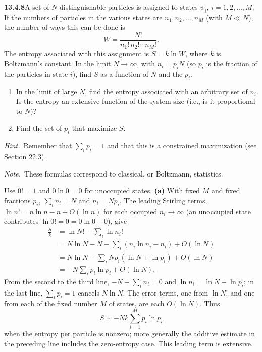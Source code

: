 \par\bigskip
\noindent\textbf{13.4.8}\quad A set of $N$ distinguishable particles is
assigned to states $\psi_{i}$, $i=1,2,\ldots,M$. If the numbers of particles
in the various states are $n_{1},n_{2},\ldots,n_{M}$ (with $M\ll N$), the
number of ways this can be done is
\[
W=\frac{N!}{n_{1}!\,n_{2}!\cdots n_{M}!}.
\]
The entropy associated with this assignment is $S=k\ln W$, where $k$ is
Boltzmann's constant. In the limit $N\to\infty$, with $n_{i}=p_{i}N$ (so
$p_{i}$ is the fraction of the particles in state $i$), find $S$ as a
function of $N$ and the $p_{i}$.
\begin{enumerate}
\item[(a)] In the limit of large $N$, find the entropy associated with an
  arbitrary set of $n_{i}$. Is the entropy an extensive function of the
  system size (i.e., is it proportional to $N$)?
\item[(b)] Find the set of $p_{i}$ that maximize $S$.
\end{enumerate}
\emph{Hint.}~Remember that $\sum_{i}p_{i}=1$ and that this is a constrained
maximization (see Section 22.3).

\emph{Note.}~These formulas correspond to classical, or Boltzmann,
statistics.
\par\smallskip
{}
\solution
Use $0!=1$ and $0\ln0=0$ for unoccupied states.
\textbf{(a)} With fixed $M$ and fixed fractions $p_i$,
$\sum_i n_i=N$ and $n_i=Np_i$.  The leading Stirling terms,
$\ln n!=n\ln n-n+O(\ln n)$ for each occupied $n_i\to\infty$ (an
unoccupied state contributes $\ln0!=0=0\ln0-0$), give
\begin{align*}
\frac Sk&=\ln N!-\sum_i\ln n_i!\\
&=N\ln N-N-\sum_i(n_i\ln n_i-n_i)+O(\ln N)\\
&=N\ln N-\sum_iNp_i(\ln N+\ln p_i)+O(\ln N)\\
&=-N\sum_i p_i\ln p_i+O(\ln N).
\end{align*}
From the second to the third line, $-N+\sum_in_i=0$ and
$\ln n_i=\ln N+\ln p_i$; in the last line, $\sum_ip_i=1$ cancels
$N\ln N$.  The error terms, one from $\ln N!$ and one from each of
the fixed number $M$ of states, are each $O(\ln N)$.
Thus
\[
\boxed{S\sim-Nk\sum_{i=1}^M p_i\ln p_i}
\]
when the entropy per particle is nonzero; more generally the
additive estimate in the preceding line includes the zero-entropy
case.  This leading term is extensive.

